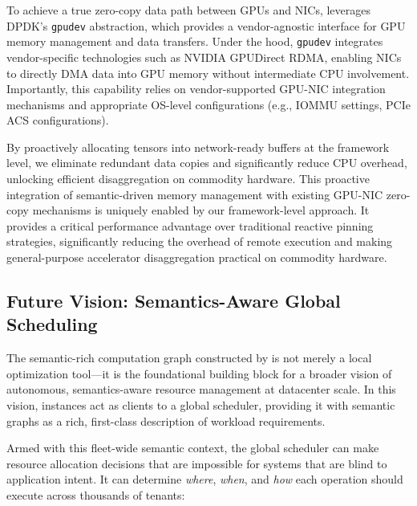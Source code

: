 To achieve a true zero-copy data path between GPUs and NICs, \sys leverages DPDK's \texttt{gpudev} abstraction, which provides a vendor-agnostic interface for GPU memory management and data transfers.
Under the hood, \texttt{gpudev} integrates vendor-specific technologies such as NVIDIA GPUDirect RDMA, enabling NICs to directly DMA data into GPU memory without intermediate CPU involvement.
Importantly, this capability relies on vendor-supported GPU-NIC integration mechanisms and appropriate OS-level configurations (e.g., IOMMU settings, PCIe ACS configurations).

By proactively allocating tensors into network-ready buff\-ers at the framework level, we eliminate redundant data copies and significantly reduce CPU overhead, unlocking efficient disaggregation on commodity hardware.
This proactive integration of semantic-driven memory management with existing GPU-NIC zero-copy mechanisms is uniquely enabled by our framework-level approach. 
It provides a critical performance advantage over traditional reactive pinning strategies, significantly reducing the overhead of remote execution and making general-purpose accelerator disaggregation practical on commodity hardware.


\subsection{Future Vision: Semantics-Aware Global Scheduling}
\label{ssec:global_scheduling}

The semantic-rich computation graph constructed by \sys is not merely a local optimization tool---it is the foundational building block for a broader vision of autonomous, semantics-aware resource management at datacenter scale. In this vision, \sys instances act as clients to a global scheduler, providing it with semantic graphs as a rich, first-class description of workload requirements.

Armed with this fleet-wide semantic context, the global scheduler can make resource allocation decisions that are impossible for systems that are blind to application intent. It can determine \textit{where}, \textit{when}, and \textit{how} each operation should execute across thousands of tenants:

